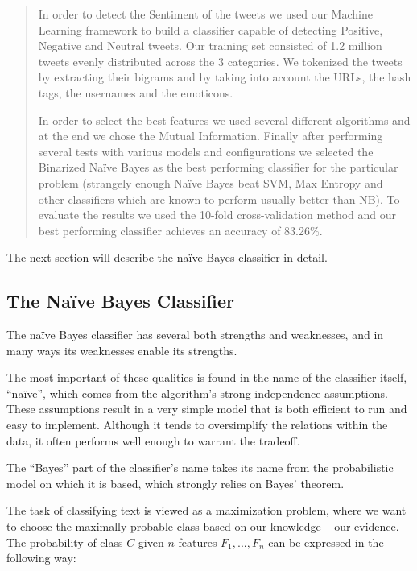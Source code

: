 \begin{quote}
  In order to detect the Sentiment of the tweets we used our Machine Learning framework to build a classifier capable of detecting Positive, Negative and Neutral tweets. Our training set consisted of 1.2 million tweets evenly distributed across the 3 categories. We tokenized the tweets by extracting their bigrams and by taking into account the URLs, the hash tags, the usernames and the emoticons.

  In order to select the best features we used several different algorithms and at the end we chose the Mutual Information. Finally after performing several tests with various models and configurations we selected the Binarized Naïve Bayes as the best performing classifier for the particular problem (strangely enough Naïve Bayes beat SVM, Max Entropy and other classifiers which are known to perform usually better than NB). To evaluate the results we used the 10-fold cross-validation method and our best performing classifier achieves an accuracy of 83.26\%.
\end{quote}

The next section will describe the naïve Bayes classifier in detail.

\subsection{The Naïve Bayes Classifier}
\label{ssec:nb_classifier}

The naïve Bayes classifier has several both strengths and weaknesses, and in many ways its weaknesses enable its strengths.

The most important of these qualities is found in the name of the classifier itself, ``naïve'', which comes from the algorithm's strong independence assumptions. These assumptions result in a very simple model that is both efficient to run and easy to implement. Although it tends to oversimplify the relations within the data, it often performs well enough to warrant the tradeoff.

The ``Bayes'' part of the classifier's name takes its name from the probabilistic model on which it is based, which strongly relies on Bayes' theorem.

The task of classifying text is viewed as a maximization problem, where we want to choose the maximally probable class based on our knowledge -- our evidence. The probability of class $C$ given $n$ features $F_1,...,F_n$ can be expressed in the following way:

